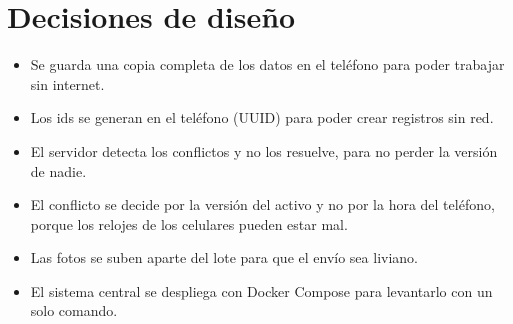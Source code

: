 \documentclass[11pt,a4paper]{article}
\begin{document}
\section{Decisiones de diseño}

\begin{itemize}
  \item Se guarda una copia completa de los datos en el teléfono para poder trabajar sin internet.
  \item Los ids se generan en el teléfono (UUID) para poder crear registros sin red.
  \item El servidor detecta los conflictos y no los resuelve, para no perder la versión de nadie.
  \item El conflicto se decide por la versión del activo y no por la hora del teléfono, porque los relojes
        de los celulares pueden estar mal.
  \item Las fotos se suben aparte del lote para que el envío sea liviano.
  \item El sistema central se despliega con Docker Compose para levantarlo con un solo comando.
\end{itemize}
\end{document}
